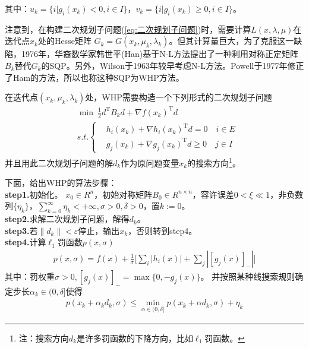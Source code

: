             其中：$u_k=\{i|g_i(x_k)<0,i\in I\}$，$v_k=\{i|g_i(x_k) \geqslant 0,i\in I\}$。
            \par
            注意到，在构建二次规划子问题(\ref{eq:二次规划子问题})时，需要计算$L(x,\lambda,\mu)$在迭代点$x_k$处的Hesse矩阵
            $G_k=G(x_k,{\mu}_k,{\lambda}_k)$。但其计算量巨大，为了克服这一缺陷，1976年，华裔数学家韩世平(Han)基于N-L方法提出了一种利用对称正定矩阵$B_k$替代$G_k$的SQP。另外，Wilson于1963年较早考虑N-L方法。Powell于1977年修正了Ham的方法，所以也称这种SQP为WHP方法。
            \par
            在迭代点$(x_k,{\mu}_k,{\lambda}_k)$处，WHP需要构造一个下列形式的二次规划子问题
            \begin{align}
            \label{eq:一般约束规划的二次规划子问题}
            &\mathop {\min} \ \frac 12 d^\mathrm{T} B_kd+\nabla f(x_k)^\mathrm{T} d\\
            &s.t.\left\{
            \begin{aligned}
            &h_i(x_k)+\nabla h_i(x_k)^\mathrm{T} d=0\quad i \in E\\
            &g_j(x_k)+\nabla g_j(x_k)^\mathrm{T} d \geqslant 0\quad j \in I
            \end{aligned}
            \right.
            \end{align}
            并且用此二次规划子问题的解$d_k$作为原问题变量$x_k$的搜索方向\footnote{注：搜索方向$d_k$是许多罚函数的下降方向，比如$\ell_1$罚函数。}。
            \par
            下面，给出WHP的算法步骤：\\
            \textbf{step1.}初始化。
            $x_0 \in R^n$，初始对称矩阵$B_0 \in R^{n\times n}$，容许误差$0<\xi \ll 1$，非负数列$\{\eta_k\}$，$\mathop {\sum}\limits_{k=0}^{\infty}{\eta_k}<{+\infty},\sigma > 0,\delta > 0$，置$k:=0$。\\
            \textbf{step2.}求解二次规划子问题，解得$d_k$。\\
            \textbf{step3.}若$\|d_{k}\|<\varepsilon$停止，输出$x_k$，否则转到step4。\\
            \textbf{step4.}计算$\ell_1$罚函数$p(x,\sigma)$
            \begin{align*}
            p(x,\sigma)=f(x)+\frac{1}{\sigma}\Big[\mathop{\sum}_i|h_i(x)|+\mathop{\sum}_j|[g_j(x)]_-|\Big]
            \end{align*}
            其中：罚权重$\sigma > 0,[g_j(x)]_-=\max\{0,-g_j(x)\}$。
            并按照某种线搜索规则确定步长${\alpha}_k \in (0,\delta ]$使得
            \begin{align*}
             p(x_k+{\alpha}_kd_k,\sigma) \leqslant \mathop{\min}\limits_{\alpha \in (0,\delta]}p(x_k+{\alpha}d_k,\sigma)+{\eta}_k
            \end{align*}
